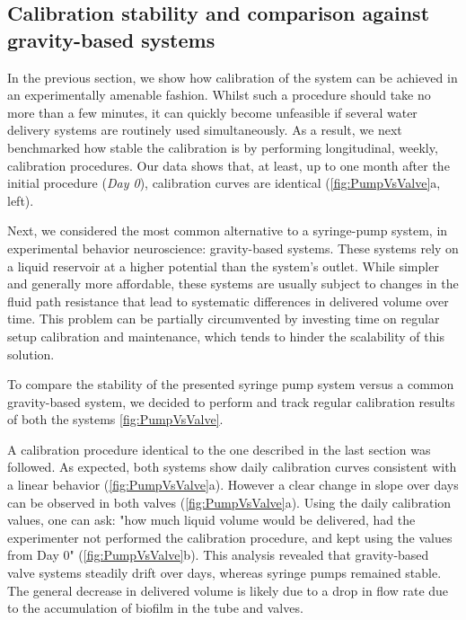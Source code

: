 \subsection*{Calibration stability and comparison against gravity-based systems}

In the previous section, we show how calibration of the system can be achieved in an experimentally amenable fashion. Whilst such a procedure should take no more than a few minutes, it can quickly become unfeasible if several water delivery systems are routinely used simultaneously. As a result, we next benchmarked how stable the calibration is by performing longitudinal, weekly, calibration procedures. Our data shows that, at least, up to one month after the initial procedure (\textit{Day 0}), calibration curves are identical (\cref{fig:PumpVsValve}a, left).

Next, we considered the most common alternative to a syringe-pump system, in experimental behavior neuroscience: gravity-based systems. These systems rely on a liquid reservoir at a higher potential than the system's outlet. While simpler and generally more affordable, these systems are usually subject to changes in the fluid path resistance that lead to systematic differences in delivered volume over time. This problem can be partially circumvented by investing time on regular setup calibration and maintenance, which tends to hinder the scalability of this solution.

To compare the stability of the presented syringe pump system versus a common gravity-based system, we decided to perform and track regular calibration results of both the systems \cref{fig:PumpVsValve}.

A calibration procedure identical to the one described in the last section was followed. As expected, both systems show daily calibration curves consistent with a linear behavior (\cref{fig:PumpVsValve}a). However a clear change in slope over days can be observed in both valves (\cref{fig:PumpVsValve}a). Using the daily calibration values, one can ask: "how much liquid volume would be delivered, had the experimenter not performed the calibration procedure, and kept using the values from Day 0" (\cref{fig:PumpVsValve}b). This analysis revealed that gravity-based valve systems steadily drift over days, whereas syringe pumps remained stable. The general decrease in delivered volume is likely due to a drop in flow rate due to the accumulation of biofilm in the tube and valves. 

